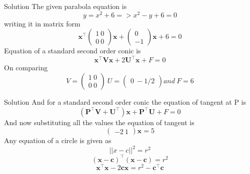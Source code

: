 \documentclass{beamer}
\begin{document}
\begin{frame}{Solution}
The given parabola equation is \\
\begin{equation}
y = x^2 + 6 => x^2 - y + 6 = 0  
\end{equation}
writing it in matrix form
\begin{equation}
 \mathbf{x}^\intercal\begin{pmatrix} 1 \ 0 \\ 0 \ 0 \end{pmatrix}\mathbf{x} + \begin{pmatrix} 0 \\ -1 \end{pmatrix}\mathbf{x} + 6 = 0
\end{equation}
Equation of a standard second order conic is
\begin{equation}
    \mathbf{x}^\intercal\mathbf{V}\mathbf{x} + 2\mathbf{U}^\intercal\mathbf{x} + F = 0
\end{equation}
On comparing
\begin{equation}
 V = \begin{pmatrix} 1 \ 0 \\ 0 \ 0 \end{pmatrix} \  U = \begin{pmatrix} 0 \ -1/2 \end{pmatrix}  and\ F = 6  
\end{equation}

\end{frame}

\begin{frame}{Solution}
And for a standard second order conic the equation of tangent at P is 
\begin{equation}
    (\mathbf{P}^\intercal\mathbf{V} + \mathbf{U}^\intercal)\mathbf{x} + \mathbf{P}^\intercal\mathbf{U} + F = 0
\end{equation}
And now substituting all the values the equation of tangent is 
\begin{equation}
    \begin{pmatrix} -2 \ 1 \end{pmatrix}\mathbf{x} = 5
\end{equation}
Any equation of a circle is given as
\begin{equation}
    ||x-c||^{2} = r^2
\end{equation}
\begin{equation}
    (\mathbf{x-c})^\intercal(\mathbf{x-c}) = r^2
\end{equation}
\begin{equation}
    \mathbf{x}^\intercal\mathbf{x} - 2\mathbf{c}\mathbf{x} = r^2 - \mathbf{c}^\intercal\mathbf{c}
\end{equation}
\end{frame}
\end{document}
